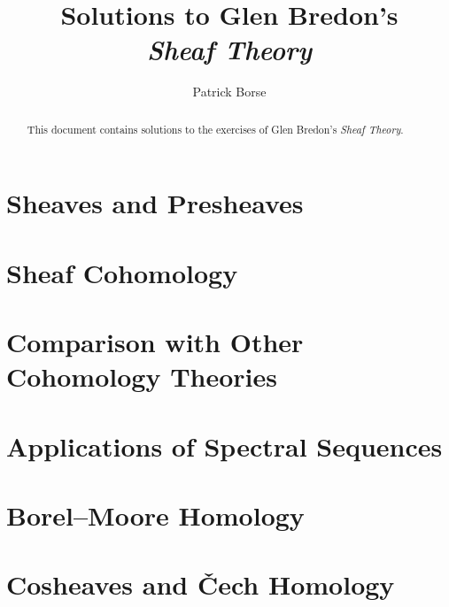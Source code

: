 \documentclass[oneside]{amsbook}
\title{Solutions to Glen Bredon's\\ \emph{Sheaf Theory}}
\author{Patrick Borse}
\numberwithin{ex}{chapter}
\begin{document}
\begin{abstract}
This document contains solutions to the exercises of Glen Bredon's \emph{Sheaf Theory}. 
\end{abstract}

\maketitle

\tableofcontents

\chapter{Sheaves and Presheaves}


\chapter{Sheaf Cohomology}


\chapter{Comparison with Other Cohomology Theories}


\chapter{Applications of Spectral Sequences}


\chapter{Borel--Moore Homology}


\chapter{Cosheaves and Čech Homology}

\end{document}
